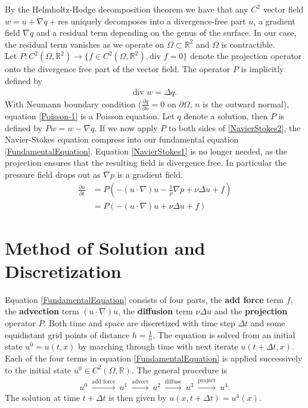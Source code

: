 \documentclass[a4paper,10pt,oneside,final,german,openbib,pdftex,titlepage]{scrbook}
\begin{document}
By the Helmholtz-Hodge decomposition theorem we have that any $C^2$ vector field $w = u + \nabla q + \text{res}$ uniquely decomposes into a divergence-free part $u$, a gradient field $\nabla q$ and a residual term depending on the genus of the surface. In our case, the residual term vanishes as we operate on $\Omega \subset \mathbb{R}^2$ and $\Omega$ is contractible.\\

Let $P : C^2(\Omega,\mathbb{R}^2) \rightarrow \{f\in C^2(\Omega, \mathbb{R}^2), \text{div } f = 0\}$ denote the projection operator onto the divergence free part of the vector field. The operator $P$ is implicitly defined by 
\begin{align}
	\text{div } w = \Delta q. \label{Poisson-1}
\end{align}
With Neumann boundary condition ($\frac{\partial q}{\partial n} = 0$ on $\partial \Omega$, $n$ is the outward normal), equation \ref{Poisson-1} is a Poisson equation. Let $q$ denote a solution, then $P$ is defined by $Pw = w - \nabla q$. 
If we now apply $P$ to both sides of \ref{NavierStokes2}, the Navier-Stokes equation compress into our fundamental equation \ref{FundamentalEquation}. Equation \ref{NavierStokes1} is no longer needed, as the projection ensures that the resulting field is divergence free. In particular the pressure field drops out as $\nabla p$ is a gradient field.
\begin{align}
	\frac{\partial u}{\partial t} &= P \left(- (u \cdot \nabla)u - \frac{1}{\rho}\nabla p + \nu \Delta u + f \right) \nonumber
	\\
	&= P\left( -(u \cdot \nabla)u + \nu \Delta u + f\right)\label{FundamentalEquation}
\end{align}
\section{Method of Solution and Discretization}
Equation \ref{FundamentalEquation} consists of four parts, the \textbf{add force} term $f$, the \textbf{advection} term $(u\cdot \nabla )u$, the \textbf{diffusion} term $\nu \Delta u$ and the \textbf{projection} operator $P$. Both time and space are discretized with time step $\Delta t$ and some equidistant grid points of distance $h= \frac{1}{n}$. The equation is solved from an initial state $u^0 = u(t,x)$ by marching through time with next iterate $u(t+\Delta t,x)$. 
Each of the four terms in equation \ref{FundamentalEquation} is applied successively to the initial state $u^0 \in C^2(\Omega,\mathbb{R})$. The general procedure is
\begin{align*}
	u^0 ~\overset{\text{add force}}{\longrightarrow}~ u^1 ~ \overset{\text{advect}}{\longrightarrow}~ u^2 ~\overset{\text{diffuse}}{\longrightarrow} ~u^3~ \overset{\text{project}}{\longrightarrow} ~u^4.
\end{align*}
The solution at time $t+\Delta t$ is then given by $u(x,t+\Delta t) = u^4(x)$.
\end{document}
